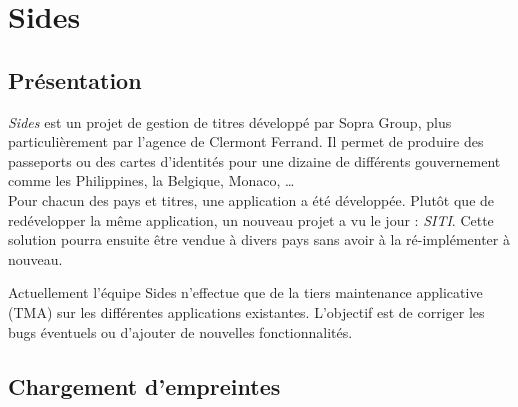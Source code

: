 \cleardoublepage

\chapter{Sides}


\section{Présentation}

\textit{Sides} est un projet de gestion de titres développé par Sopra Group, plus particulièrement par l'agence de Clermont Ferrand.
Il permet de produire des passeports ou des cartes d'identités pour une dizaine de différents gouvernement comme les Philippines, la Belgique, Monaco, \ldots
\\

Pour chacun des pays et titres, une application a été développée.
Plutôt que de redévelopper la même application, un nouveau projet a vu le jour : \textit{SITI}.
Cette solution pourra ensuite être vendue à divers pays sans avoir à la ré-implémenter à nouveau.

Actuellement l'équipe Sides n'effectue que de la tiers maintenance applicative (TMA) sur les différentes applications existantes.
L'objectif est de corriger les bugs éventuels ou d'ajouter de nouvelles fonctionnalités.


\section{Chargement d'empreintes}


